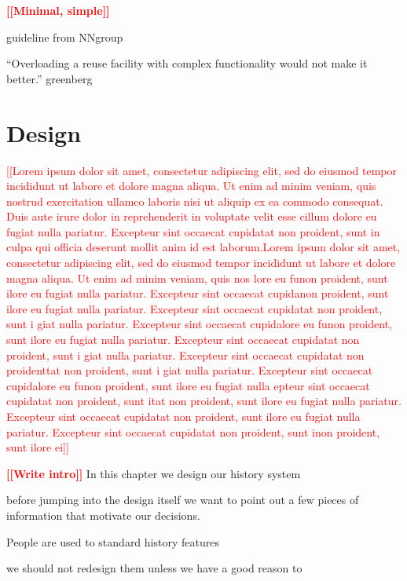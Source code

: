 \documentclass[thesis=M,english]{FITthesis}[2012/10/20]
\newcommand{\todotext}[1]{\textcolor{red}{\textbf{[[#1]]}}}
\newcommand{\redtext}[1]{\textcolor{red}{[[#1]]}}
\begin{document}
\todotext{Minimal, simple}

guideline from NNgroup

“Overloading a reuse facility with complex functionality would not make it better.” greenberg


\chapter{Design}



\redtext{Lorem ipsum dolor sit amet, consectetur adipiscing elit, sed do eiusmod tempor incididunt ut labore et dolore magna aliqua. Ut enim ad minim veniam, quis nostrud exercitation ullamco laboris nisi ut aliquip ex ea commodo consequat. Duis aute irure dolor in reprehenderit in voluptate velit esse cillum dolore eu fugiat nulla pariatur. Excepteur sint occaecat cupidatat non proident, sunt in culpa qui officia deserunt mollit anim id est laborum.Lorem ipsum dolor sit amet, consectetur adipiscing elit, sed do eiusmod tempor incididunt ut labore et dolore magna aliqua. Ut enim ad minim veniam, quis nos lore eu funon proident, sunt ilore eu fugiat nulla pariatur. Excepteur sint occaecat cupidanon proident, sunt ilore eu fugiat nulla pariatur. Excepteur sint occaecat cupidatat non proident, sunt i giat nulla pariatur. Excepteur sint occaecat cupidalore eu funon proident, sunt ilore eu fugiat nulla pariatur. Excepteur sint occaecat cupidatat non proident, sunt i giat nulla pariatur. Excepteur sint occaecat cupidatat non proidenttat non proident, sunt i giat nulla pariatur. Excepteur sint occaecat cupidalore eu funon proident, sunt ilore eu fugiat nulla epteur sint occaecat cupidatat non proident, sunt itat non proident, sunt ilore eu fugiat nulla pariatur. Excepteur sint occaecat cupidatat non proident, sunt ilore eu fugiat nulla pariatur. Excepteur sint occaecat cupidatat non proident, sunt inon proident, sunt ilore ei}


\todotext{Write intro}
In this chapter we design our history system

before jumping into the design itself we want to point out a few pieces of information that motivate our decisions.


People are used to standard history features

we should not redesign them unless we have a good reason to
\end{document}
